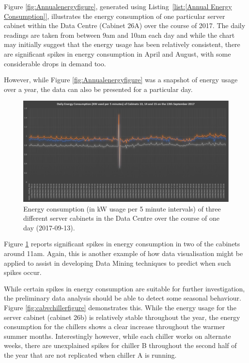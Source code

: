 \documentclass[12pt]{scrartcl}
\begin{document}
Figure \ref{fig:Annualenergyfigure}, generated using Listing~\ref{list:[Annual Energy Consumption]}, illustrates the energy consumption of one particular server cabinet within the Data Centre (Cabinet 26A) over the course of 2017. The daily readings are taken from between 9am and 10am each day and while the chart may initially suggest that the energy usage has been relatively consistent, there are significant spikes in energy consumption in April and August, with some considerable drops in demand too. 

However, while Figure \ref{fig:Annualenergyfigure} was a snapshot of energy usage over a year, the data can also be presented for a particular day. 

\begin{figure}[H]
  \caption{Energy consumption (in kW usage per 5 minute intervals) of three different server cabinets in the Data Centre over the course of one day (2017-09-13).}
  \label{fig:Dailyenergyfigure}
  \centering
    \includegraphics[scale=0.35]{Daily_energy_consumption_of_cab131415}
\end{figure}
   
Figure \ref{fig:Dailyenergyfigure} reports significant spikes in energy consumption in two of the cabinets around 11am. Again, this is another example of how data visualisation might be applied to assist in developing Data Mining techniques to predict when such spikes occur. 

While certain spikes in energy consumption are suitable for further investigation, the preliminary data analysis should be able to detect some seasonal behaviour. Figure \ref{fig:cabvchillerfigure} demonstrates this. While the energy usage for the server cabinet (cabinet 26b) is relatively stable throughout the year, the energy consumption for the chillers shows a clear increase throughout the warmer summer months. Interestingly however, while each chiller works on alternate weeks, there are unexplained spikes for chiller B throughout the second half of the year that are not replicated when chiller A is running. 
\end{document}
